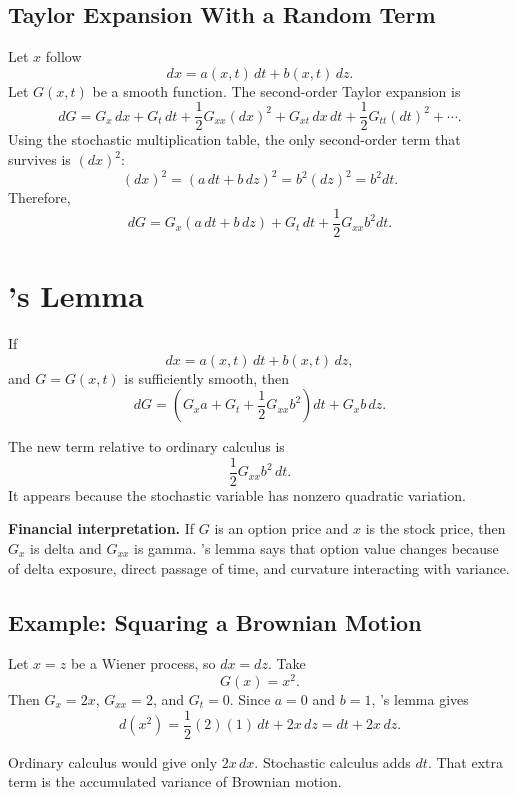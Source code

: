 \subsection{Taylor Expansion With a Random Term}

Let $x$ follow
\[
    dx=a(x,t)\,dt+b(x,t)\,dz.
\]
Let $G(x,t)$ be a smooth function. The second-order Taylor expansion is
\[
    dG
    =
    G_x\,dx+G_t\,dt
    +\frac{1}{2}G_{xx}(dx)^2
    +G_{xt}\,dx\,dt
    +\frac{1}{2}G_{tt}(dt)^2
    +\cdots.
\]
Using the stochastic multiplication table, the only second-order term that
survives is $(dx)^2$:
\[
    (dx)^2
    =
    (a\,dt+b\,dz)^2
    =
    b^2(dz)^2
    =
    b^2dt.
\]
Therefore,
\[
    dG
    =
    G_x(a\,dt+b\,dz)+G_t\,dt+\frac{1}{2}G_{xx}b^2dt.
\]

\section{\Ito's Lemma}

\begin{thmN}
If
\[
    dx=a(x,t)\,dt+b(x,t)\,dz,
\]
and $G=G(x,t)$ is sufficiently smooth, then
\[
    dG
    =
    \left(
        G_xa+G_t+\frac{1}{2}G_{xx}b^2
    \right)dt
    +
    G_xb\,dz.
\]
\end{thmN}

The new term relative to ordinary calculus is
\[
    \frac{1}{2}G_{xx}b^2\,dt.
\]
It appears because the stochastic variable has nonzero quadratic variation.

\begin{boxD}
\textbf{Financial interpretation.} If $G$ is an option price and $x$ is the
stock price, then $G_x$ is delta and $G_{xx}$ is gamma. \Ito's lemma says that
option value changes because of delta exposure, direct passage of time, and
curvature interacting with variance.
\end{boxD}

\subsection{Example: Squaring a Brownian Motion}

Let $x=z$ be a Wiener process, so $dx=dz$. Take
\[
    G(x)=x^2.
\]
Then $G_x=2x$, $G_{xx}=2$, and $G_t=0$. Since $a=0$ and $b=1$,
\Ito's lemma gives
\[
    d(x^2)=\frac{1}{2}(2)(1)\,dt+2x\,dz
    =
    dt+2x\,dz.
\]

Ordinary calculus would give only $2x\,dx$. Stochastic calculus adds $dt$.
That extra term is the accumulated variance of Brownian motion.

